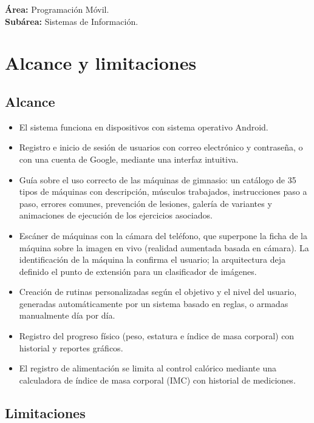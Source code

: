 \textbf{Área:} Programación Móvil.\\
\textbf{Subárea:} Sistemas de Información.

\section{Alcance y limitaciones}
\label{sec:alcance}

\subsection{Alcance}

\begin{itemize}
    \item El sistema funciona en dispositivos con sistema operativo Android.
    \item Registro e inicio de sesión de usuarios con correo electrónico y
    contraseña, o con una cuenta de Google, mediante una interfaz intuitiva.
    \item Guía sobre el uso correcto de las máquinas de gimnasio: un catálogo
    de 35 tipos de máquinas con descripción, músculos trabajados,
    instrucciones paso a paso, errores comunes, prevención de lesiones,
    galería de variantes y animaciones de ejecución de los ejercicios
    asociados.
    \item Escáner de máquinas con la cámara del teléfono, que superpone la
    ficha de la máquina sobre la imagen en vivo (realidad aumentada basada en
    cámara). La identificación de la máquina la confirma el usuario; la
    arquitectura deja definido el punto de extensión para un clasificador de
    imágenes.
    \item Creación de rutinas personalizadas según el objetivo y el nivel del
    usuario, generadas automáticamente por un sistema basado en reglas, o
    armadas manualmente día por día.
    \item Registro del progreso físico (peso, estatura e índice de masa
    corporal) con historial y reportes gráficos.
    \item El registro de alimentación se limita al control calórico mediante
    una calculadora de índice de masa corporal (IMC) con historial de
    mediciones.
\end{itemize}

\subsection{Limitaciones}

